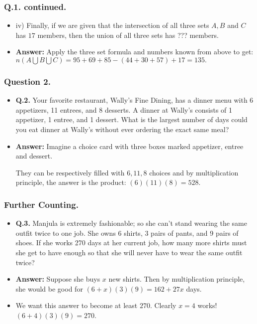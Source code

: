 %


\begin{frame}%
  \frametitle{Q.1. continued.}
  \begin{itemize}%

\item iv) Finally, if we are given that  the intersection of all three sets $A, B$ and $C$
has $17$ members, then the union of all three sets has  ??? members.
\item {\bf Answer:} Apply the three set formula and numbers known from
above to get:
$n(A \bigcup B \bigcup C) = 95+69+85 -(44+30+57) + 17 = 135.$




\end{itemize}
\end{frame}
%



\begin{frame}%
  \frametitle{Question 2.}
  \begin{itemize}%
\item {\bf Q.2.}
Your favorite restaurant, Wally's Fine Dining, has a dinner menu with 6 appetizers,
11 entrees, and 8 desserts.
A dinner at Wally's consists of 1 appetizer, 1 entree, and 1 dessert.
What is the largest number of  days could you eat dinner at Wally's without ever
ordering the exact same meal?

\item
{\bf Answer:}
Imagine a choice card with three boxes marked appetizer, entree and
dessert.

They can be respectively filled with $6,11,8$ choices and by
multiplication principle, the answer is the product: $(6)(11)(8) = 528$.


\end{itemize}
\end{frame}

%

\begin{frame}%
  \frametitle{Further Counting.}
  \begin{itemize}%
\item {\bf Q.3.}
Manjula is extremely fashionable; so she can't stand wearing the same outfit
twice to one job.  She owns 6 shirts, 3 pairs of pants, and 9 pairs of shoes.
If she works 270 days at her current job, how many more shirts must she get to have
enough so that she will never have to wear the same outfit twice?

\item
{\bf Answer:} Suppose she buys $x$ new shirts. Then by multiplication
principle, she would be good for $(6+x)(3)(9) = 162 + 27x$ days.

\item We want this
answer to become at least $270$. Clearly $x=4 $ works!
$(6+4)(3)(9)=270$. 

\end{itemize}
\end{frame}

